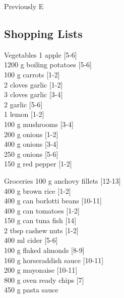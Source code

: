 \begin{menu}{Previously E}
    \subsection*{Shopping Lists}
      \begin{shoppinglist}{Vegetables}
      1  apple 
        {\scriptsize[5-6]}\\
      1200 g boiling potatoes 
        {\scriptsize[5-6]}\\
      100 g carrots 
        {\scriptsize[1-2]}\\
      2 cloves garlic 
        {\scriptsize[1-2]}\\
      3 cloves garlic 
        {\scriptsize[3-4]}\\
      2  garlic 
        {\scriptsize[5-6]}\\
      1  lemon 
        {\scriptsize[1-2]}\\
      100 g mushrooms 
        {\scriptsize[3-4]}\\
      200 g onions 
        {\scriptsize[1-2]}\\
      400 g onions 
        {\scriptsize[3-4]}\\
      250 g onions 
        {\scriptsize[5-6]}\\
      150 g red pepper 
        {\scriptsize[1-2]}\\
      \end{shoppinglist}%
      \begin{shoppinglist}{Groceries}
      100 g anchovy fillets 
        {\scriptsize[12-13]}\\
      400 g brown rice 
        {\scriptsize[1-2]}\\
      400 g can borlotti beans 
        {\scriptsize[10-11]}\\
      400 g can tomatoes 
        {\scriptsize[1-2]}\\
      150 g can tuna fish 
        {\scriptsize[14]}\\
      2 tbsp cashew nuts 
        {\scriptsize[1-2]}\\
      400 ml cider 
        {\scriptsize[5-6]}\\
      100 g flaked almonds 
        {\scriptsize[8-9]}\\
      160 g horseraddish sauce 
        {\scriptsize[10-11]}\\
      200 g mayonaise 
        {\scriptsize[10-11]}\\
      800 g oven ready chips 
        {\scriptsize[7]}\\
      450 g pasta sauce 

\end{shoppinglist}
\end{menu}
